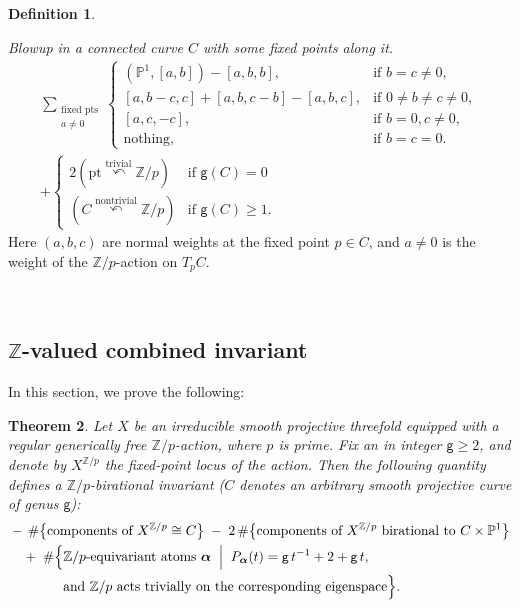 \documentclass[12pt,a4paper]{amsart}
\newtheorem{theorem}{Theorem}[section]
\theoremstyle{definition}
\newtheorem{definition}[theorem]{Definition}
\theoremstyle{remark}
\newcommand{\Z}{\mathbb{Z}}
\newcommand{\PP}{\mathbb{P}}
\begin{document}
\begin{definition}
\begin{defsubenum}
    \item[(Bl2-b)] \emph{Blowup in a connected curve $C$ with some fixed points along it.}
    \begin{align}
    \sum_{\substack{\text{fixed pts} \\ a \neq 0}} 
    \begin{cases}
    (\mathbb{P}^1,[a,b]) - [a,b,b], & \text{if } b=c\neq 0, \\
    [a,b-c,c] + [a,b,c-b] - [a,b,c], & \text{if } 0 \neq b \neq c \neq 0, \\
    [a,c,-c], & \text{if } b=0, c \neq 0, \\
    \text{nothing}, & \text{if } b=c=0.
    \end{cases}\\
    +\begin{cases}2(\mathrm{pt}\stackrel{\mathrm{trivial}}{\curvearrowleft}\mathbb{Z}/p) & \text{if } \mathsf g(C)=0\\
    (C\stackrel{\mathrm{nontrivial}}{\curvearrowleft} \Z/p ) & \text{if } \mathsf g(C)\ge 1.
    \end{cases}
    \end{align}
  Here $(a,b,c)$ are normal weights at the fixed point $p\in C$, and $a\ne 0$ is the weight of the $\Z/p$-action on $T_p C$.  
    
\end{defsubenum}
\end{definition}



\ 

\subsection{$\mathbb Z$-valued combined invariant}
\label{sec:Z-invariants}
In this section, we prove the following:
\begin{theorem}\label{thm:invariant}
Let \(X\) be an irreducible smooth projective threefold equipped with a regular generically free \(\mathbb{Z}/p\)-action, where \(p\) is prime. Fix an in integer \(\mathsf{g} \geq 2\), and denote by \(X^{\mathbb{Z}/p}\) the fixed-point locus of the action. Then the following quantity defines a \(\mathbb{Z}/p\)-birational invariant ($C$ denotes an arbitrary smooth projective curve of genus \(\mathsf g\)):
\begin{equation}
\begin{split}
  &-\,\#\bigl\{\text{components of }X^{\Z/p}\cong C\bigr\}
   \;-\;2\,\#\bigl\{\text{components of $X^{\Z/p}$ birational to }C\times\PP^1\bigr\}\\
  &\quad+\;\#\Bigl\{\Z/p\text{-equivariant atoms }\boldsymbol{\alpha} \;\Bigm|\;
       P_{\boldsymbol{\alpha}}(t)=\mathsf{g}\,t^{-1}+2+\mathsf{g}\,t,\\
  &\qquad\qquad\text{and }\Z/p\text{ acts trivially on the corresponding eigenspace}
    \Bigr\}.
\end{split}
\end{equation}
\end{theorem}
\end{document}
